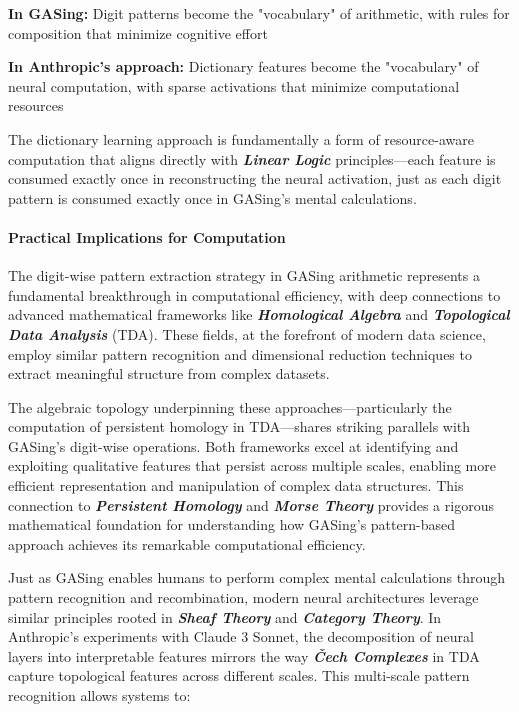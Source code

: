 \noindent\textbf{In GASing:} Digit patterns become the "vocabulary" of arithmetic, with rules for composition that minimize cognitive effort


\noindent\textbf{In Anthropic's approach:} Dictionary features become the "vocabulary" of neural computation, with sparse activations that minimize computational resources


The dictionary learning approach is fundamentally a form of resource-aware computation that aligns directly with \textbf{\textit{Linear Logic}} principles—each feature is consumed exactly once in reconstructing the neural activation, just as each digit pattern is consumed exactly once in GASing's mental calculations.
\paragraph{Practical Implications for Computation}

The digit-wise pattern extraction strategy in GASing arithmetic represents a fundamental breakthrough in computational efficiency, with deep connections to advanced mathematical frameworks like \textbf{\textit{Homological Algebra}} and \textbf{\textit{Topological Data Analysis}} (TDA). These fields, at the forefront of modern data science, employ similar pattern recognition and dimensional reduction techniques to extract meaningful structure from complex datasets.

The algebraic topology underpinning these approaches—particularly the computation of persistent homology in TDA—shares striking parallels with GASing's digit-wise operations. Both frameworks excel at identifying and exploiting qualitative features that persist across multiple scales, enabling more efficient representation and manipulation of complex data structures. This connection to \textbf{\textit{Persistent Homology}} and \textbf{\textit{Morse Theory}} provides a rigorous mathematical foundation for understanding how GASing's pattern-based approach achieves its remarkable computational efficiency.

Just as GASing enables humans to perform complex mental calculations through pattern recognition and recombination, modern neural architectures leverage similar principles rooted in \textbf{\textit{Sheaf Theory}} and \textbf{\textit{Category Theory}}. In Anthropic's experiments with Claude 3 Sonnet, the decomposition of neural layers into interpretable features mirrors the way \textbf{\textit{Čech Complexes}} in TDA capture topological features across different scales. This multi-scale pattern recognition allows systems to:

